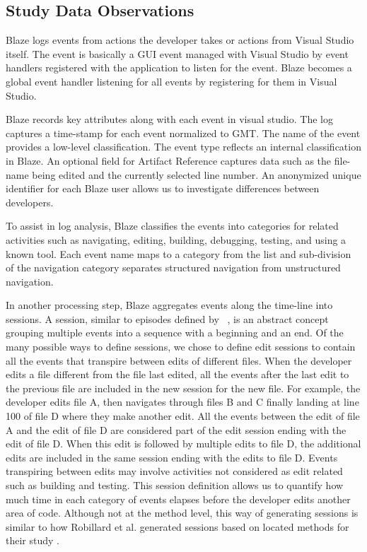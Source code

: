 \documentclass{sig-alternate}
\begin{document}
\subsection{Study Data Observations}

Blaze logs events from actions the developer takes or actions from Visual Studio itself.  The event is basically a GUI event managed with Visual Studio by event handlers registered with the application to listen for the event.  Blaze becomes a global event handler listening for all events by registering for them in Visual Studio.  

Blaze records key attributes along with each event in visual studio.  The log captures a time-stamp for each event normalized to GMT.  The name of the event provides a low-level classification.  The event type reflects an internal classification in Blaze.  An optional field for Artifact Reference captures data such as the file-name being edited and the currently selected line number.  An anonymized unique identifier for each Blaze user allows us to investigate differences between developers.

To assist in log analysis, Blaze classifies the events into categories for related activities such as navigating, editing, building, debugging,  testing, and using a  known tool.  Each event name maps to a category from the list and sub-division of the navigation category separates structured navigation from unstructured navigation.

In another processing step, Blaze aggregates events along the time-line into sessions.  A session, similar to episodes defined by ~\cite{Kou2010Operational}, is an abstract concept grouping multiple events into a sequence with a beginning and an end.  Of the many possible ways to define sessions, we chose to define edit sessions to contain all the events that transpire between edits of different files.  When the developer edits a file different from the file last edited, all the events after the last edit to the previous file are included in the new session for the new file.  For example, the developer edits file A, then navigates through files B and C finally landing at line 100 of file D where they make another edit.  All the events between the edit of file A and the edit of file D are considered part of the edit session ending with the edit of file D.  When this edit is followed by multiple edits to file D, the additional edits are included in the same session ending with the edits to file D.   Events transpiring between edits may involve activities not considered as edit related such as building and testing.  This session definition allows us to quantify how much time in each category of events elapses before the developer edits another area of code.  Although not at the method level, this way of generating sessions is similar to how Robillard et al. generated sessions based on located methods for their study \cite{wbsnipes:Robillard2004How}.
\end{document}

